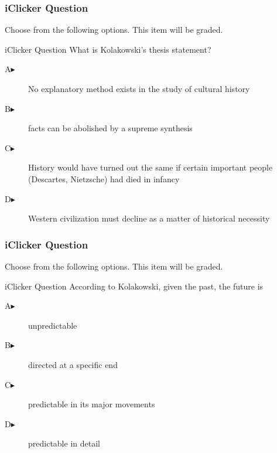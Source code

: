 \documentclass[xcolor=dvipsnames]{beamer}
\begin{document}
\begin{frame}
  \frametitle{iClicker Question}
Choose from the following options. This item will be graded.
\begin{block}{iClicker Question}
What is Kolakowski's thesis statement?
\end{block}
\begin{description}
\item[A\hspace{.2in}$\blacktriangleright$] No explanatory method exists in the study of cultural history
\item[B\hspace{.2in}$\blacktriangleright$] facts can be abolished by a supreme synthesis
\item[C\hspace{.2in}$\blacktriangleright$] History would have turned out the same if certain important people (Descartes, Nietzsche) had died in infancy
\item[D\hspace{.2in}$\blacktriangleright$] Western civilization must decline as a matter of historical necessity
\end{description}
\end{frame}

\begin{frame}
  \frametitle{iClicker Question}
Choose from the following options. This item will be graded.
\begin{block}{iClicker Question}
According to Kolakowski, given the past, the future is
\end{block}
\begin{description}
\item[A\hspace{.2in}$\blacktriangleright$] unpredictable
\item[B\hspace{.2in}$\blacktriangleright$] directed at a specific end
\item[C\hspace{.2in}$\blacktriangleright$] predictable in its major movements
\item[D\hspace{.2in}$\blacktriangleright$] predictable in detail
\end{description}
\end{frame}
\end{document}
